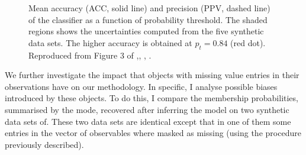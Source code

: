 \begin{figure}[ht!]
\begin{center}
\caption{Mean accuracy (ACC, solid line) and precision (PPV, dashed line) of the classifier as a function of probability threshold. The shaded regions shows the uncertainties computed from the five synthetic data sets. The higher accuracy is obtained at $p_t=0.84$ (red dot). Reproduced from Figure 3 of \citet{Olivares2017},\textit{}, , .}
\label{fig:ACC}
\end{center}
\end{figure}

We further investigate the impact that objects with missing value entries in their observations have on our methodology. In specific, I analyse possible biases introduced by these objects. To do this, I compare the membership probabilities, summarised by the mode, recovered after inferring the model on two synthetic data sets of. These two data sets are identical except that in one of them some entries in the vector of observables where masked as missing (using the procedure previously described).

